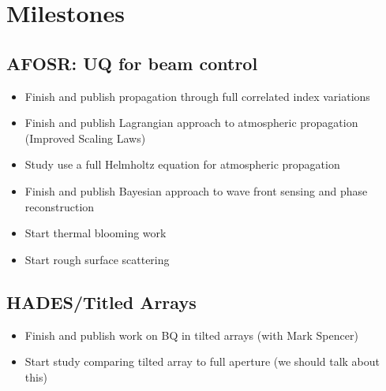\documentclass[11pt]{article}
\title{\documentTitle}
\author{Daniel S. Cargill}
\date{\today}
\begin{document}
\maketitle

\section{Milestones}

\subsection{AFOSR: UQ for beam control}
\begin{itemize}
   \item{Finish and publish propagation through full correlated index variations}
   \item{Finish and publish Lagrangian approach to atmospheric propagation (Improved Scaling Laws)}
   \item{Study use a full Helmholtz equation for atmospheric propagation}
   \item{Finish and publish Bayesian approach to wave front sensing and phase reconstruction}
   \item{Start thermal blooming work}
   \item{Start rough surface scattering}
\end{itemize}

\subsection{HADES/Titled Arrays}
\begin{itemize}
   \item{Finish and publish work on BQ in tilted arrays (with Mark Spencer)}
   \item{Start study comparing tilted array to full aperture (we should talk about this) }
\end{itemize}

\label{lastpage}





%
%

% 

\end{document}
